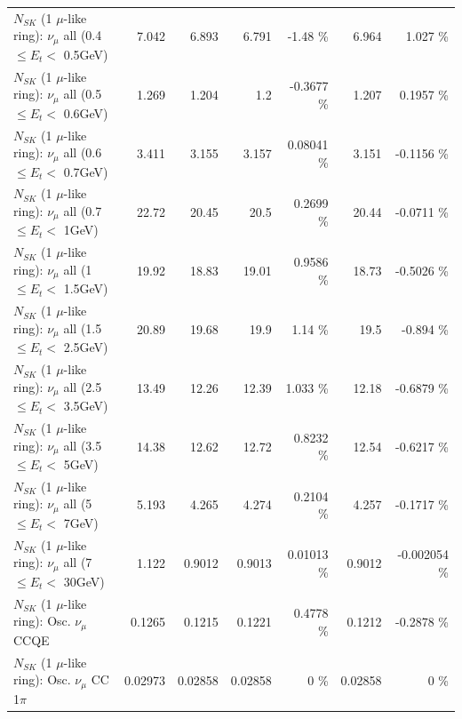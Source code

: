 \begin{table}
\begin{tabular}{| l | r | r | r  r | r  r |}
       $N_{SK}$ (1 $\mu$-like ring): $\nu_{\mu}$ all (0.4 $\leq E_{t} <$ 0.5GeV) &           7.042 &           6.893 &           6.791 &    -1.48 \%  &           6.964 &    1.027 \%  \\ 
       $N_{SK}$ (1 $\mu$-like ring): $\nu_{\mu}$ all (0.5 $\leq E_{t} <$ 0.6GeV) &           1.269 &           1.204 &             1.2 &  -0.3677 \%  &           1.207 &   0.1957 \%  \\ 
       $N_{SK}$ (1 $\mu$-like ring): $\nu_{\mu}$ all (0.6 $\leq E_{t} <$ 0.7GeV) &           3.411 &           3.155 &           3.157 &  0.08041 \%  &           3.151 &  -0.1156 \%  \\ 
         $N_{SK}$ (1 $\mu$-like ring): $\nu_{\mu}$ all (0.7 $\leq E_{t} <$ 1GeV) &           22.72 &           20.45 &            20.5 &   0.2699 \%  &           20.44 &  -0.0711 \%  \\ 
         $N_{SK}$ (1 $\mu$-like ring): $\nu_{\mu}$ all (1 $\leq E_{t} <$ 1.5GeV) &           19.92 &           18.83 &           19.01 &   0.9586 \%  &           18.73 &  -0.5026 \%  \\ 
       $N_{SK}$ (1 $\mu$-like ring): $\nu_{\mu}$ all (1.5 $\leq E_{t} <$ 2.5GeV) &           20.89 &           19.68 &            19.9 &     1.14 \%  &            19.5 &   -0.894 \%  \\ 
       $N_{SK}$ (1 $\mu$-like ring): $\nu_{\mu}$ all (2.5 $\leq E_{t} <$ 3.5GeV) &           13.49 &           12.26 &           12.39 &    1.033 \%  &           12.18 &  -0.6879 \%  \\ 
         $N_{SK}$ (1 $\mu$-like ring): $\nu_{\mu}$ all (3.5 $\leq E_{t} <$ 5GeV) &           14.38 &           12.62 &           12.72 &   0.8232 \%  &           12.54 &  -0.6217 \%  \\ 
           $N_{SK}$ (1 $\mu$-like ring): $\nu_{\mu}$ all (5 $\leq E_{t} <$ 7GeV) &           5.193 &           4.265 &           4.274 &   0.2104 \%  &           4.257 &  -0.1717 \%  \\ 
          $N_{SK}$ (1 $\mu$-like ring): $\nu_{\mu}$ all (7 $\leq E_{t} <$ 30GeV) &           1.122 &          0.9012 &          0.9013 &  0.01013 \%  &          0.9012 & -0.002054 \%  \\ 
\hline
\hline
                               $N_{SK}$ (1 $\mu$-like ring): Osc. $\nu_\mu$ CCQE &          0.1265 &          0.1215 &          0.1221 &   0.4778 \%  &          0.1212 &  -0.2878 \%  \\ 
                          $N_{SK}$ (1 $\mu$-like ring): Osc. $\nu_\mu$ CC 1$\pi$ &         0.02973 &         0.02858 &         0.02858 &        0 \%  &         0.02858 &        0 \%  \\ 

\end{tabular}
\end{table}
